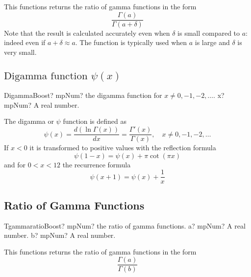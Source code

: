 \vspace{0.3cm}
This functions returns the ratio of gamma functions in the form
\begin{equation}
	\frac{\Gamma(a)}{\Gamma(a+\delta)}
\end{equation}
Note that the result is calculated accurately even when $\delta$ is small compared to $a$: indeed even if $a+\delta \approx a$. The function is typically used when $a$ is large and $\delta$ is very small.




\subsection{\texorpdfstring{$\text{Digamma function }\psi(x)$}{Digamma}}

\begin{mpFunctionsExtract}
	\mpFunctionOne
	{DigammaBoost? mpNum? the digamma function for $x \neq 0, -1, -2,\ldots$.}
	{x? mpNum? A real number.}
\end{mpFunctionsExtract}

\vspace{0.3cm}
The digamma or $\psi$ function is defined as
\begin{equation}
	\psi(x) = \frac{d(\ln \Gamma(x))}{dx} = \frac{\Gamma'(x)}{\Gamma(x)}, \quad x \neq 0, -1, -2,\ldots
\end{equation}
If $x<0$ it is transformed to positive values with the reflection formula
\begin{equation}
	\psi(1-x)=\psi(x) + \pi \cot(\pi x)
\end{equation}
and for $0<x<12$ the recurrence formula
\begin{equation}
	\psi(x+1)=\psi(x) + \frac{1}{x}
\end{equation}





\subsection{Ratio of Gamma Functions}

\begin{mpFunctionsExtract}
	\mpFunctionTwo
	{TgammaratioBoost? mpNum?  the ratio of gamma functions.}
	{a? mpNum? A real number.}
	{b? mpNum? A real number.}
\end{mpFunctionsExtract}

\vspace{0.3cm}
This functions returns the ratio of gamma functions in the form
\begin{equation}
	\frac{\Gamma(a)}{\Gamma(b)} 
\end{equation}



